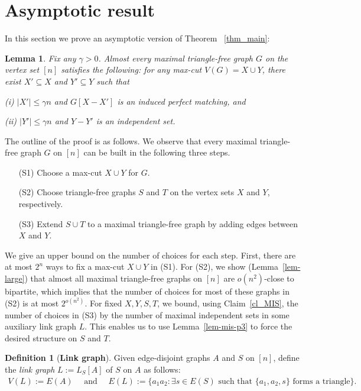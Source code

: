 \documentclass[12pt]{article}
\newtheorem{lemma}[theorem]{Lemma}
\theoremstyle{definition}
\theoremstyle{definition}
\theoremstyle{definition}
\theoremstyle{definition}
\newtheorem{defn}[theorem]{Definition}
\theoremstyle{definition}
\theoremstyle{definition}
\theoremstyle{definition}
\newcommand{\ga}{\gamma}
\newcommand{\3}{\bf{3}}
\newcommand{\setm}{-}
\begin{document}
\section{Asymptotic result}\label{s_Asymptotic}
In this section we prove an asymptotic version of Theorem~
\ref{thm_main}:
\begin{lemma}\label{lem-asymp} Fix any $\ga>0$. Almost every maximal triangle-free graph $G$ on the vertex set $[n]$ satisfies the following: for any max-cut $V(G)=X\cup Y$, there exist $X'\subseteq X$ and $Y'\subseteq Y$ such that 

(i) $|X'|\leq \ga n$ and $G[X\setm X']$ is an induced perfect matching, and

(ii) $|Y'|\leq \ga n$ and $Y\setm Y'$ is an independent set.
\end{lemma}

The outline of the proof is as follows. We observe that every maximal triangle-free graph $G$ on $[n]$ can be built in the following three steps. 
\begin{enumerate}
\setlength{\itemsep}{1pt}
  \setlength{\parskip}{0pt}
  \setlength{\parsep}{0pt}
\item[(S1)] Choose a max-cut $X\cup Y$ for $G$.
\item[(S2)] Choose triangle-free graphs $S$ and $T$ on the vertex sets $X$ and $Y$, respectively. 
\item[(S3)] Extend $S\cup T$ to a maximal triangle-free graph by adding edges between $X$ and $Y$. 
\end{enumerate}
We give an upper bound on the number of choices for each step. First, there are at most $2^n$ ways to fix a max-cut $X\cup Y$ in (S1). For (S2), we show (Lemma~\ref{lem-large}) that almost all maximal triangle-free graphs on $[n]$ are $o(n^2)$-close to bipartite, which implies that the number of choices for most of these graphs in (S2) is at most $2^{o(n^2)}$. For fixed $X,Y,S,T$, we bound, using Claim~\ref{cl_MIS}, the number of choices in (S3) by the number of maximal independent sets in some auxiliary link graph $L$. This enables us to use Lemma~\ref{lem-mis-p3} to force the desired structure on $S$ and $T$.

\begin{defn} [\textbf{Link graph}]
Given edge-disjoint graphs $A$ and $S$ on $[n]$, define 
the \emph{link graph} $L:=L_{S}[A]$ of $S$ on $A$ as follows:
$$
\begin{array}{lllll}
V(L):=E(A) \quad \mbox{ and }\quad
E(L):=\{a_1 a_2: \exists s\in E(S)\mbox{ such that }  \{a_1,a_2,s\} \mbox{ forms a triangle}  \}.
\end{array}
$$
\end{defn}
\end{document}
